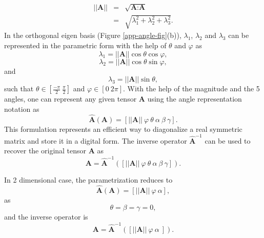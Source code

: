 \begin{eqnarray}\label{app-angle-5}
||\textbf{A}|| & = & \sqrt{\textbf{A}:\textbf{A}}\\
 & = & \sqrt{\lambda_1^2+\lambda_2^2+\lambda_3^2}.
\end{eqnarray}
In the orthogonal eigen basis (Figure \ref{app-angle-fig}(b)), $ \lambda_1 $, $ \lambda_2 $ and $ \lambda_3 $ can be represented in the parametric form with the help of $ \theta $ and $ \varphi $ as 
\begin{equation}\label{app-angle-6}
\lambda_1=||\textbf{A}||\cos\theta\cos\varphi,
\end{equation}
\begin{equation}\label{app-angle-7}
\lambda_2=||\textbf{A}||\cos\theta\sin\varphi,
\end{equation}
and
\begin{equation}\label{app-angle-8}
\lambda_3=||\textbf{A}||\sin\theta,
\end{equation}
such that $ \theta\in\left[\frac{-\pi}{2}\ \frac{\pi}{2}\right] $ and $ \varphi\in\left[0\ 2\pi\right] $. With the help of the magnitude and the 5 angles, one can represent any given tensor $ \textbf{A} $ using the angle representation notation as
\begin{equation}\label{app-angle-9}
\hat{\textbf{A}}(\textbf{A})=\left[||\textbf{A}||\ \varphi\ \theta\ \alpha\ \beta\ \gamma\right].
\end{equation}
This formulation represents an efficient way to diagonalize a real symmetric matrix and store it in a digital form. The inverse operator $ \hat{\textbf{A}}^{-1} $ can be used to recover the original tensor $ \textbf{A} $ as
\begin{equation}\label{app-angle-11}
\textbf{A}=\hat{\textbf{A}}^{-1}\left(\left[||\textbf{A}||\ \varphi\ \theta\ \alpha\ \beta\ \gamma\right]\right).
\end{equation}

In 2 dimensional case, the parametrization reduces to
\begin{equation}\label{app-angle-10}
\hat{\textbf{A}}(\textbf{A})=\left[||\textbf{A}||\ \varphi\ \alpha\right],
\end{equation}
as 
\[ \theta=\beta=\gamma=0, \]
and the inverse operator is
\begin{equation}\label{app-angle-12}
\textbf{A}=\hat{\textbf{A}}^{-1}\left(\left[||\textbf{A}||\ \varphi\ \alpha\ \right]\right).
\end{equation}

